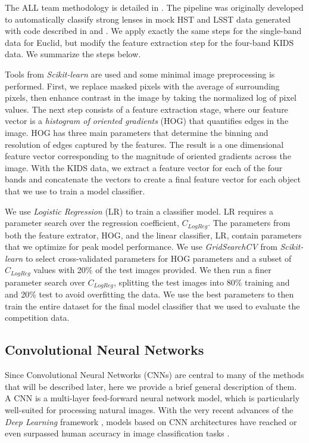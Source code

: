 \documentclass{aa}
\begin{document}
The ALL team methodology is detailed in \citet{avestruz_etal17}. The
pipeline was originally developed to automatically classify strong
lenses in mock HST and LSST
data generated with code described in \citet{li_etal16} and
\citet{collett_15}.  We apply exactly the same steps for the single-band
data for Euclid, but modify the feature extraction step for the
four-band KIDS data.  We summarize the steps below.

Tools from {\em Scikit-learn} \citep{pedregosa_etal12} are used and
some minimal image preprocessing is  performed. First, we replace masked pixels
with the average of surrounding pixels, then enhance contrast in the
image by taking the normalized log of pixel values.  The next step 
consists of a feature extraction stage, where our feature
vector is a {\em histogram of oriented gradients} (HOG)
\citep{dalalandtriggs_05} that quantifies edges in the image.  HOG has
three main parameters that determine the binning and resolution of
edges captured by the features.  The result is a one dimensional
feature vector corresponding to the magnitude of oriented gradients
across the image.  With the KIDS data, we extract a feature vector for
each of the four bands and concatenate the vectors to create a final
feature vector for each object that we use to train a model
classifier.

We use {\em Logistic Regression} (LR) 
to train a classifier model.  LR requires a parameter search over the
regression coefficient, $C_{LogReg}$.  The parameters from both the
feature extrator, HOG, and the linear classifier, LR, contain
parameters that we optimize for peak model performance.  We use {\em
  GridSearchCV} from {\em Scikit-learn} to select cross-validated
parameters for HOG parameters and a subset of $C_{LogReg}$ values with
20\% of the test images provided.  We then run a finer parameter
search over $C_{LogReg}$, splitting the test images into 80\% training
and and 20\% test to avoid overfitting the data.  We use the best
parameters to then train the entire dataset for the final model
classifier that we used to evaluate the competition data.

\subsection{Convolutional Neural Networks}

Since Convolutional Neural Networks (CNNs) are central to many of the methods that will be described later, here we provide a brief general description of them.  A CNN \citep{Fukushima1980,Lecun1998} is a multi-layer feed-forward neural network model, which is particularly well-suited for processing natural images. With the very recent advances of the \textit{Deep Learning} framework \citep{Lecun2015}, models based on CNN architectures have reached or even surpassed human accuracy in image classification tasks \citep{He2015a}.
\end{document}
